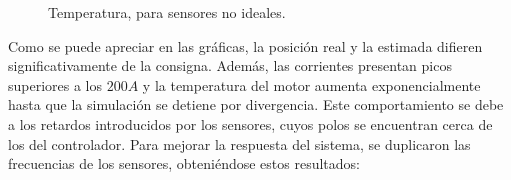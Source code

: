 \documentclass[a4paper, 10pt, onecolumn,journal]{ieeeconf}
\begin{document}
\begin{figure}[H]
	\centering
	\begin{adjustbox}{scale=0.5,max width=\columnwidth}
	\end{adjustbox}
	\caption{Temperatura, para sensores no ideales.}
	\label{Temperatura, para sensores no ideales}
\end{figure}

Como se puede apreciar en las gráficas, la posición real y la estimada difieren significativamente de la consigna. Además, las corrientes presentan picos superiores a los $200 A$ y la temperatura del motor aumenta exponencialmente hasta que la simulación se detiene por divergencia. Este comportamiento se debe a los retardos introducidos por los sensores, cuyos polos se encuentran cerca de los del controlador. Para mejorar la respuesta del sistema, se duplicaron las frecuencias de los sensores, obteniéndose estos resultados:
\end{document}
